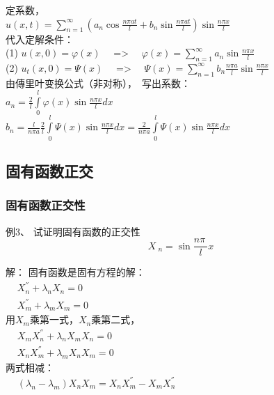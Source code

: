 \begin{frame}
	\frametitle{}	
	定系数，\\
	$ \displaystyle u(x,t)= \sum\limits_{n=1}^{\infty }  (a_n\cos\frac{ n\pi at}{l}+ b_n\sin \frac{ n\pi at}{l}) \sin \frac{ n\pi x}{l}$\\ \vspace{0.6em}
	代入定解条件：\\ 
	(1) $ \displaystyle u(x,0)= \varphi (x)$ ~~=> ~~$\varphi (x)=\sum_{n=1}^{\infty } a_n \sin \frac{ n\pi x}{l}$\\  
	(2) $ \displaystyle u_t(x,0)= \Psi (x)$ ~~=> ~~$\Psi (x)=\sum_{n=1}^{\infty } b_n \frac{ n\pi a}{l} \sin \frac{ n\pi x}{l}$ \\  \vspace{0.3cm}
	由傳里叶变换公式（非对称）， 写出系数：\\  
	$ \displaystyle a_n=  \frac{2}{l}\int\limits_{0 }^{l}  \varphi (x) \sin \frac{ n\pi x}{l} dx $\\   
	$ \displaystyle b_n= \frac{l} { n\pi a} \frac{2}{l}\int\limits_{0 }^{l}  \Psi  (x) \sin \frac{ n\pi x}{l} dx =  \frac{2} { n\pi a}  \int\limits_{0 }^{l}  \Psi  (x) \sin \frac{ n\pi x}{l} dx$\\   
\end{frame}	



\subsection{固有函数正交}
\begin{frame}
	\frametitle{固有函数正交性}	
	\begin{exampleblock} {例3、	试证明固有函数的正交性}
		\begin{equation*}
			X~_n= \sin \frac{n\pi~}{l} x  
		\end{equation*}
	\end{exampleblock} 	
	\alert{解：} 固有函数是固有方程的解：\\
	$\begin{array}{llll}
		&X_n ^{''}+\lambda_n X_n=0\\
		&X_m ^{''}+\lambda_m X_m=0
	\end{array}$ \\ 
	用$X_m$乘第一式，$X_n$乘第二式，\\
	$\begin{array}{llll}
		&X_m X_n ^{''}+\lambda_n X_m X_n=0\\
		&X_nX_m ^{''}+\lambda_m X_n X_m=0
	\end{array}$ \\ 
	两式相减：\\
	$\begin{array}{llll}
		& (\lambda_n-\lambda_m) X_n X_m= X_nX_m ^{''}-X_mX_n ^{''} 
	\end{array}$ \\ 
\end{frame}	

